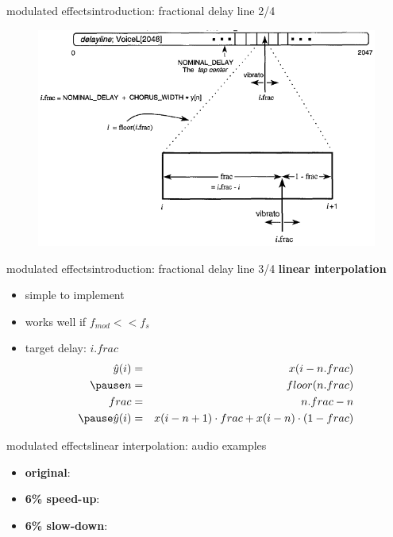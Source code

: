 		\begin{frame}{modulated effects}{introduction: fractional delay line 2/4}
			\begin{figure}
				\centerline{\includegraphics[scale=.6]{graph/frac_delay_line}}
				\label{fig:frac_delay_line}
			\end{figure}
		\end{frame}

		\begin{frame}{modulated effects}{introduction: fractional delay line 3/4}
			\textbf{linear interpolation}
			\begin{itemize}
				\item	simple to implement
				\item	works well if $f_{mod} << f_s$
			\pause
			\item	target delay: $i.frac$
				\begin{eqnarray*}
					\hat{y}(i) &=& x(i - n.frac)\\
					\pause
					n &=& floor(n.frac)\\
					frac &=& n.frac - n\\
					\pause
					\hat{y}(i) &=& x(i-n + 1)\cdot frac + x(i-n)\cdot (1-frac)
				\end{eqnarray*}
			\end{itemize}
		\end{frame}

		\begin{frame}{modulated effects}{linear interpolation: audio examples}
			\begin{itemize}
				\item   \textbf{original}: 
				\smallskip
				\item   \textbf{6\% speed-up}: 
				\smallskip
				\item   \textbf{6\% slow-down}: 
			\end{itemize}
		\end{frame}

